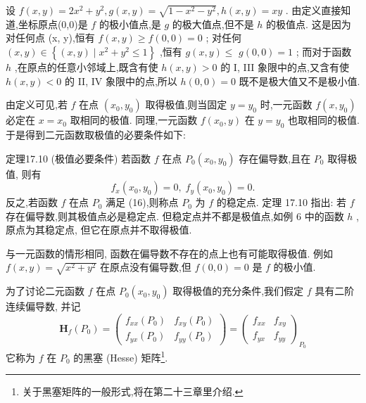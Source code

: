 \begin{example}

\end{example}
设 \(f\left( {x,y}\right)  = 2{x}^{2} + {y}^{2},g\left( {x,y}\right)  = \sqrt{1 - {x}^{2} - {y}^{2}},h\left( {x,y}\right)  = {xy}\) . 由定义直接知道,坐标原点(0,0)是 \(f\) 的极小值点,是 \(g\) 的极大值点,但不是 \(h\) 的极值点. 这是因为对任何点 (x, y),恒有 \(f\left( {x,y}\right)  \geq  f\left( {0,0}\right)  = 0\) ; 对任何 \(\left( {x,y}\right)  \in  \left\{  {\left( {x,y}\right)  \mid  {x}^{2} + {y}^{2} \leq  1}\right\}\) ,恒有 \(g\left( {x,y}\right)  \leq\)  \(g\left( {0,0}\right)  = 1\) ; 而对于函数 \(h\) ,在原点的任意小邻域上,既含有使 \(h\left( {x,y}\right)  > 0\) 的 I, III 象限中的点,又含有使 \(h\left( {x,y}\right)  < 0\) 的 II, IV 象限中的点,所以 \(h\left( {0,0}\right)  = 0\) 既不是极大值又不是极小值.

由定义可见,若 \(f\) 在点 \(\left( {{x}_{0},{y}_{0}}\right)\) 取得极值,则当固定 \(y = {y}_{0}\) 时,一元函数 \(f\left( {x,{y}_{0}}\right)\) 必定在 \(x = {x}_{0}\) 取相同的极值. 同理,一元函数 \(f\left( {{x}_{0},y}\right)\) 在 \(y = {y}_{0}\) 也取相同的极值. 于是得到二元函数取极值的必要条件如下:

定理17.10 (极值必要条件) 若函数 \(f\) 在点 \({P}_{0}\left( {{x}_{0},{y}_{0}}\right)\) 存在偏导数,且在 \({P}_{0}\) 取得极值, 则有
\[
{f}_{x}\left( {{x}_{0},{y}_{0}}\right)  = 0,\;{f}_{y}\left( {{x}_{0},{y}_{0}}\right)  = 0. \tag{16}
\]
反之,若函数 \(f\) 在点 \({P}_{0}\) 满足 (16),则称点 \({P}_{0}\) 为 \(f\) 的稳定点. 定理 17.10 指出: 若 \(f\) 存在偏导数,则其极值点必是稳定点. 但稳定点并不都是极值点,如例 6 中的函数 \(h\) ,原点为其稳定点, 但它在原点并不取得极值.

与一元函数的情形相同, 函数在偏导数不存在的点上也有可能取得极值. 例如 \(f\left( {x,y}\right)  = \sqrt{{x}^{2} + {y}^{2}}\) 在原点没有偏导数,但 \(f\left( {0,0}\right)  = 0\) 是 \(f\) 的极小值.

为了讨论二元函数 \(f\) 在点 \({P}_{0}\left( {{x}_{0},{y}_{0}}\right)\) 取得极值的充分条件,我们假定 \(f\) 具有二阶连续偏导数, 并记
\[
{\mathbf{H}}_{f}\left( {P}_{0}\right)  = \left( \begin{array}{ll} {f}_{xx}\left( {P}_{0}\right) & {f}_{xy}\left( {P}_{0}\right) \\  {f}_{yx}\left( {P}_{0}\right) & {f}_{yy}\left( {P}_{0}\right)  \end{array}\right)  = {\left( \begin{array}{ll} {f}_{xx} & {f}_{xy} \\  {f}_{yx} & {f}_{yy} \end{array}\right) }_{{P}_{0}} \tag{17}
\]
它称为 \(f\) 在 \({P}_{0}\) 的黑塞 (Hesse) 矩阵\footnote{关于黑塞矩阵的一般形式,将在第二十三章里介绍.}.

